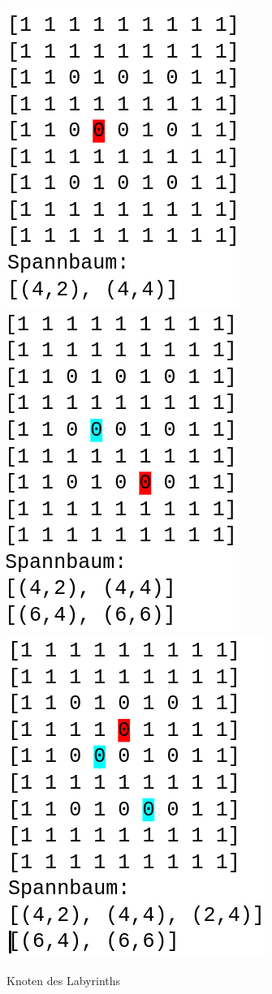 \documentclass[12pt, a4paper, titlepage]{article}
\begin{document}
\begin{figure}[h]
	\centering
	\includegraphics[scale=.4]{textlab1.png}
	\includegraphics[scale=.4]{textlab2.png}
	\includegraphics[scale=.4]{textlab3.png}
	\caption{Knoten des Labyrinths}
	\label{fig: textlab0}
\end{figure}
\end{document}
